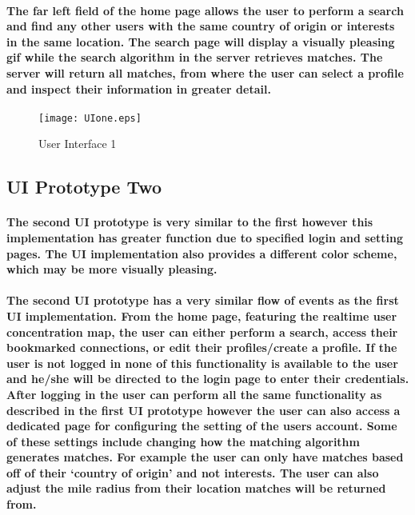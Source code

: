 \documentclass[12pt]{article}
\begin{document}
  \paragraph{\normalfont \indent The far left field of the home page allows the user to perform a search and find any other users with the same country of origin or interests in the same location. The search page will display a visually pleasing gif while the search algorithm in the server retrieves matches. The server will return all matches, from where the user can select a profile and inspect their information in greater detail.
  }

        \begin{figure}[H]
                \texttt{[image: UIone.eps]}
                \caption{User Interface 1}
                \label{fig: User Interface 1}
        \end{figure}
\restoregeometry

\newpage
  \subsection{\bf UI Prototype Two}

      \paragraph{\normalfont \indent The second UI prototype is very similar to the first however this implementation has greater function due to specified login and setting pages. The UI implementation also provides a different color scheme, which may be more visually pleasing.
      }
      \paragraph{\normalfont \indent The second UI prototype has a very similar flow of events as the first UI implementation. From the home page, featuring the realtime user concentration map, the user can either perform a search, access their bookmarked connections, or edit their profiles/create a profile. If the user is not logged in none of this functionality is available to the user and he/she will be directed to the login page to enter their credentials. After logging in the user can perform all the same functionality as described in the first UI prototype however the user can also access a dedicated page for configuring the setting of the users account. Some of these settings include changing how the matching algorithm generates matches. For example the user can only have matches based off of their ‘country of origin’ and not interests. The user can also adjust the mile radius from their location matches will be returned from.
      }
\end{document}
